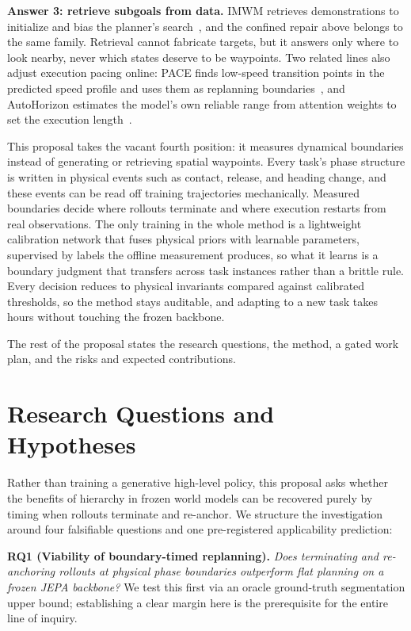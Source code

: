 \documentclass[11pt]{article}
\begin{document}
\textbf{Answer 3: retrieve subgoals from data.} IMWM retrieves demonstrations to initialize and bias the planner's search~\cite{imwm2026}, and the confined repair above belongs to the same family. Retrieval cannot fabricate targets, but it answers only where to look nearby, never which states deserve to be waypoints. Two related lines also adjust execution pacing online: PACE finds low-speed transition points in the predicted speed profile and uses them as replanning boundaries~\cite{pace2026}, and AutoHorizon estimates the model's own reliable range from attention weights to set the execution length~\cite{autohorizon2026}.

This proposal takes the vacant fourth position: it measures dynamical boundaries instead of generating or retrieving spatial waypoints. Every task's phase structure is written in physical events such as contact, release, and heading change, and these events can be read off training trajectories mechanically. Measured boundaries decide where rollouts terminate and where execution restarts from real observations. The only training in the whole method is a lightweight calibration network that fuses physical priors with learnable parameters, supervised by labels the offline measurement produces, so what it learns is a boundary judgment that transfers across task instances rather than a brittle rule. Every decision reduces to physical invariants compared against calibrated thresholds, so the method stays auditable, and adapting to a new task takes hours without touching the frozen backbone.

The rest of the proposal states the research questions, the method, a gated work plan, and the risks and expected contributions.

\section{Research Questions and Hypotheses}

Rather than training a generative high-level policy, this proposal asks whether the benefits of hierarchy in frozen world models can be recovered purely by timing when rollouts terminate and re-anchor. We structure the investigation around four falsifiable questions and one pre-registered applicability prediction:

\textbf{RQ1 (Viability of boundary-timed replanning).} \textit{Does terminating and re-anchoring rollouts at physical phase boundaries outperform flat planning on a frozen JEPA backbone?} We test this first via an oracle ground-truth segmentation upper bound; establishing a clear margin here is the prerequisite for the entire line of inquiry.
\end{document}
